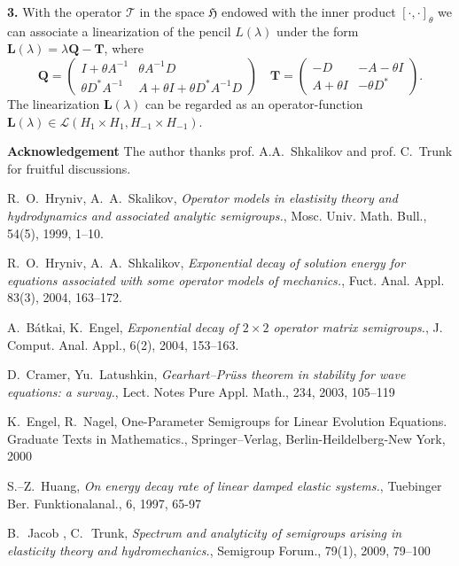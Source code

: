 \documentclass[12pt, reqno]{amsart}
\theoremstyle{plain}
\begin{document}
\textbf{3.} With the operator ${{\mathcal{T} }}$ in the space ${{\mathfrak H}}$ endowed with the inner
product $[\cdot,\cdot]_\theta$ we can associate a linearization of the pencil
$L(\lambda)$ under the form $\mathbf{L}(\lambda)=\lambda \mathbf{Q}-\mathbf{T}$,
where
 \[ 
   \mathbf{Q}=\begin{pmatrix} {{I}}+\theta A^{-1} & \theta A^{-1}D \\ \theta D^* A^{-1} & A+\theta{{I}}+\theta D^* A^{-1}D \end{pmatrix}
   \quad
   \mathbf{T}=\begin{pmatrix} -D & -A-\theta{{I}} \\ A+\theta{{I}} &   -\theta D^* \end{pmatrix}.
 \]
The linearization  $\mathbf{L}(\lambda)$ can be regarded as an operator-function
$\mathbf{L}(\lambda)\in{{\mathcal{L} }}(H_1\times H_1,H_{-1}\times H_{-1})$.
 
\textbf{Acknowledgement} The author thanks prof. A.A.~Shkalikov and prof. C.~Trunk 
for fruitful discussions.

\begin{thebibliography}{99}

R.~O.~Hryniv, A.~A.~Skalikov, \textit{Operator models in elastisity theory and hydrodynamics and
associated analytic semigroups.}, Mosc. Univ. Math. Bull., 54(5), 1999, 1--10.

 R.~O.~Hryniv, A.~A.~Shkalikov, \textit{ Exponential decay of solution energy for equations associated with
some operator models of mechanics.}, Fuct. Anal. Appl. 83(3), 2004, 163--172.

A.~B\'{a}tkai, K.~Engel, \textit{Exponential decay of $2\times2$ operator matrix semigroups.},
 J. Comput. Anal. Appl., 6(2), 2004, 153--163.

D.~Cramer, Yu.~Latushkin, \textit{ Gearhart--Pr\"{u}ss theorem in stability
for wave equations: a survay.}, Lect. Notes Pure Appl. Math., 
234, 2003, 105--119

K.~Engel, R.~Nagel, One-Parameter Semigroups for Linear Evolution
Equations.  Graduate Texts in Mathematics., Springer--Verlag,
Berlin-Heildelberg-New York, 2000

S.--Z.~Huang, \textit{On energy decay rate of linear damped elastic systems.},
Tuebinger Ber. Funktionalanal., 6, 1997, 65-97

B.\,~Jacob , C.\,~Trunk, \textit{Spectrum and analyticity of semigroups
arising in elasticity theory and hydromechanics.},
Semigroup Forum., 79(1), 2009, 79--100

\end{thebibliography}
\end{document}
